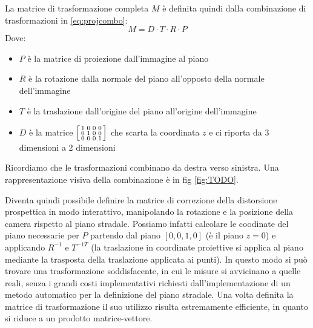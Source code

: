 La matrice di trasformazione completa $M$ è definita quindi dalla combinazione di trasformazioni in \ref{eq:projcombo}:
\begin{equation}
    \label{eq:projcombo}
    M = D \cdot T \cdot R \cdot P
\end{equation}
Dove:
\begin{itemize}
    \item $P$ è la matrice di proiezione dall'immagine al piano
    \item $R$ è la rotazione dalla normale del piano all'opposto della normale dell'immagine
    \item $T$ è la traslazione dall'origine del piano all'origine dell'immagine
    \item $D$ è la matrice 
    $
    \begin{bsmallmatrix}
        1 & 0 & 0 & 0 \\
        0 & 1 & 0 & 0 \\
        0 & 0 & 0 & 1 \\
    \end{bsmallmatrix}
    $
    che scarta la coordinata $z$ e ci riporta da 3 dimensioni a 2 dimensioni
\end{itemize}
Ricordiamo che le trasformazioni combinano da destra verso sinistra.
Una rappresentazione visiva della combinazione è in fig \ref{fig:TODO}.

Diventa quindi possibile definire la matrice di correzione della distorsione prospettica in modo interattivo, manipolando la rotazione e la posizione della camera rispetto al piano stradale.
Possiamo infatti calcolare le coodinate del piano necessarie per $P$ partendo dal piano $[0, 0, 1, 0]$ (è il piano $z=0$) e applicando $R^{-1}$ e $T^{-1T}$ (la traslazione in coordinate proiettive si applica al piano mediante la trasposta della traslazione applicata ai punti).
In questo modo si può trovare una trasformazione soddisfacente, in cui le misure si avvicinano a quelle reali, senza i grandi costi implementativi richiesti dall'implementazione di un metodo automatico per la definizione del piano stradale.
Una volta definita la matrice di trasformazione il suo utilizzo risulta estremamente efficiente, in quanto si riduce a un prodotto matrice-vettore.

